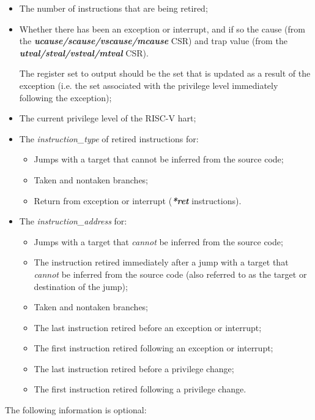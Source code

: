 \begin{itemize}
  \item The number of instructions that are being retired;
  \item Whether there has been an exception or interrupt, and if so the cause 
        (from the \textbf{\textit{ucause/scause/vscause/mcause}} CSR)
        and trap value (from the \textbf{\textit{utval/stval/vstval/mtval}} CSR).

The register set to output should be the set that is updated as a result of the exception (i.e. 
the set associated with the privilege level immediately following the exception);

  \item The current privilege level of the RISC-V hart;
  \item The \textit{instruction\_type} of retired instructions for:
    \begin{itemize}
      \item Jumps with a target that cannot be inferred from the source code;
      \item Taken and nontaken branches;
      \item Return from exception or interrupt (\textbf{\textit{*ret}} instructions).
    \end{itemize}
  \item The \textit{instruction\_address} for:
    \begin{itemize}
      \item Jumps with a target that \textit{cannot} be inferred from the source code;
      \item The instruction retired immediately after a jump with a target that \textit{cannot} be inferred 
        from the source code (also referred to as the target or destination of the jump);
      \item Taken and nontaken branches;
      \item The last instruction retired before an exception or interrupt;
      \item The first instruction retired following an exception or interrupt;
      \item The last instruction retired before a privilege change;
      \item The first instruction retired following a privilege change.
    \end{itemize}
\end{itemize}

The following information is optional:


